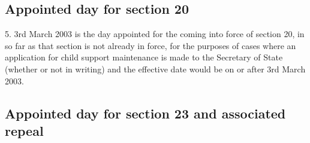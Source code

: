 \documentclass[12pt,a4paper]{article}
\begin{document}
\subsection[5. Appointed day for section 20]{Appointed day for section 20}

5.  3rd March 2003 is the day appointed for the coming into force of section 20, in so far as that section is not already in force, for the purposes of cases where an application for child support maintenance is made to the Secretary of State (whether or not in writing) and the effective date would be on or after 3rd March 2003.

%
%
%
%
%

\subsection[6. Appointed day for section 23 and associated repeal]{Appointed day for section 23 and associated repeal}
\end{document}
